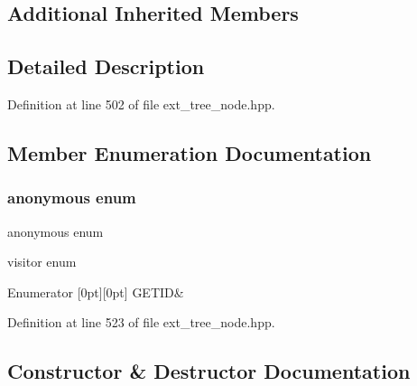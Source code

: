 \subsection*{Additional Inherited Members}


\subsection{Detailed Description}


Definition at line 502 of file ext\+\_\+tree\+\_\+node.\+hpp.



\subsection{Member Enumeration Documentation}
\mbox{\label{structomp__task__pragma_a8ec24e09afe0ec62f8bfd7be080eebd5}} 
\subsubsection{\texorpdfstring{anonymous enum}{anonymous enum}}
{\footnotesize\ttfamily anonymous enum}



visitor enum 

\begin{DoxyEnumFields}{Enumerator}
[0pt][0pt]{}\mbox{\label{structomp__task__pragma_a8ec24e09afe0ec62f8bfd7be080eebd5a942964266ed950c2659db67c807ab712}} 
G\+E\+T\+ID&\\
\hline

\end{DoxyEnumFields}


Definition at line 523 of file ext\+\_\+tree\+\_\+node.\+hpp.



\subsection{Constructor \& Destructor Documentation}
\mbox{\label{structomp__task__pragma_a7dc6713b8c01f0a80a90c083e3fe154a}} 
